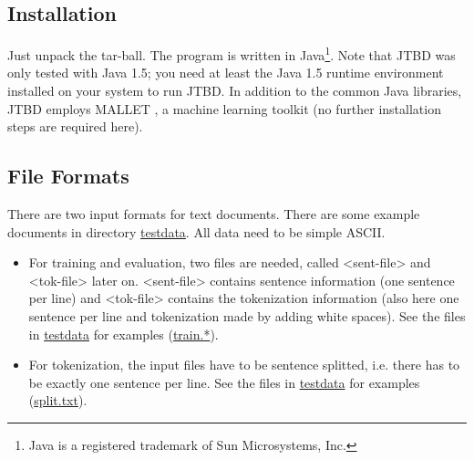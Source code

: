 \documentclass[11pt,a4paper,halfparskip]{scrartcl}
\begin{document}





\subsection{Installation}
Just unpack the tar-ball. The program is written in Java\footnote{Java
  is a registered trademark of Sun Microsystems, Inc.}. Note that JTBD
was only tested with Java 1.5; you need at least the Java 1.5 runtime
environment installed on your system to run JTBD. In addition to the
common Java libraries, JTBD employs \textsc{MALLET} \cite{mallet}, a
machine learning toolkit (no further installation steps are
required here).

\subsection{File Formats}
\label{sec_formats}


There are two input formats for text documents. There are some example
documents in directory \url{testdata}. All data need to be simple
ASCII.

\begin{itemize}
\item For training and evaluation, two files are needed, called
  <sent-file> and <tok-file> later on. <sent-file> contains sentence
  information (one sentence per line) and <tok-file> contains the
  tokenization information (also here one sentence per line and
  tokenization made by adding white spaces). See the files in
  \url{testdata} for examples (\url{train.*}).
\item For tokenization, the input files have to be sentence splitted,
  i.e. there has to be exactly one sentence per line.  See the files
  in \url{testdata} for examples (\url{split.txt}).
\end{itemize}
\end{document}
